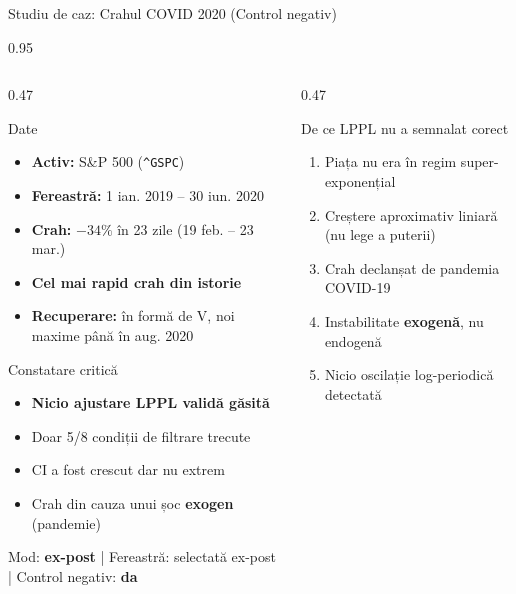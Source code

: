 \documentclass[9pt, aspectratio=169, t]{beamer}
\begin{document}
\begin{frame}{Studiu de caz: Crahul COVID 2020 (Control negativ)}
    \begin{cminipage}{0.95\textwidth}
    {\footnotesize
    \begin{columns}[T]
        \begin{column}{0.47\textwidth}
            \begin{block}{Date}
                \begin{itemize}\setlength{\itemsep}{0pt}
                    \item \textbf{Activ:} S\&P 500 (\texttt{\^{}GSPC})
                    \item \textbf{Fereastră:} 1 ian. 2019 -- 30 iun. 2020
                    \item \textbf{Crah:} $-34\%$ în 23 zile (19 feb. -- 23 mar.)
                    \item \textbf{Cel mai rapid crah din istorie}
                    \item \textbf{Recuperare:} în formă de V, noi maxime până în aug. 2020
                \end{itemize}
            \end{block}

            \begin{alertblock}{Constatare critică}
                \begin{itemize}\setlength{\itemsep}{0pt}
                    \item \textbf{Nicio ajustare LPPL validă găsită}
                    \item Doar 5/8 condiții de filtrare trecute
                    \item CI a fost crescut dar nu extrem
                    \item Crah din cauza unui șoc \textbf{exogen} (pandemie)
                \end{itemize}
            \end{alertblock}
            \vspace{-2mm}
            {\scriptsize\textcolor{MediumGray}{Mod: \textbf{ex-post} | Fereastră: selectată ex-post | Control negativ: \textbf{da}}}
        \end{column}
        \begin{column}{0.47\textwidth}
            \begin{exampleblock}{De ce LPPL nu a semnalat corect}
                \begin{enumerate}\setlength{\itemsep}{0pt}
                    \item Piața nu era în regim super-exponențial
                    \item Creștere aproximativ liniară (nu lege a puterii)
                    \item Crah declanșat de pandemia COVID-19
                    \item Instabilitate \textbf{exogenă}, nu endogenă
                    \item Nicio oscilație log-periodică detectată
                \end{enumerate}
            \end{exampleblock}


\end{column}
\end{columns}}
\end{cminipage}
\end{frame}
\end{document}
